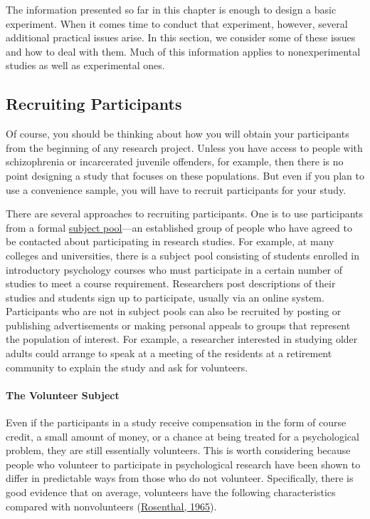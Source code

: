 \documentclass[
]{krantz}
\begin{document}
The information presented so far in this chapter is enough to design a basic experiment. When it comes time to conduct that experiment, however, several additional practical issues arise. In this section, we consider some of these issues and how to deal with them. Much of this information applies to nonexperimental studies as well as experimental ones.

\hypertarget{recruiting-participants}{%
\subsection*{Recruiting Participants}\label{recruiting-participants}}


Of course, you should be thinking about how you will obtain your participants from the beginning of any research project. Unless you have access to people with schizophrenia or incarcerated juvenile offenders, for example, then there is no point designing a study that focuses on these populations. But even if you plan to use a convenience sample, you will have to recruit participants for your study.

There are several approaches to recruiting participants. One is to use participants from a formal \protect\hyperlink{subject-pool}{subject pool}---an established group of people who have agreed to be contacted about participating in research studies. For example, at many colleges and universities, there is a subject pool consisting of students enrolled in introductory psychology courses who must participate in a certain number of studies to meet a course requirement. Researchers post descriptions of their studies and students sign up to participate, usually via an online system. Participants who are not in subject pools can also be recruited by posting or publishing advertisements or making personal appeals to groups that represent the population of interest. For example, a researcher interested in studying older adults could arrange to speak at a meeting of the residents at a retirement community to explain the study and ask for volunteers.

\hypertarget{the-volunteer-subject}{%
\paragraph*{The Volunteer Subject}\label{the-volunteer-subject}}

Even if the participants in a study receive compensation in the form of course credit, a small amount of money, or a chance at being treated for a psychological problem, they are still essentially volunteers. This is worth considering because people who volunteer to participate in psychological research have been shown to differ in predictable ways from those who do not volunteer. Specifically, there is good evidence that on average, volunteers have the following characteristics compared with nonvolunteers (\protect\hyperlink{ref-rosenthal1965volunteer}{Rosenthal, 1965}).
\end{document}
